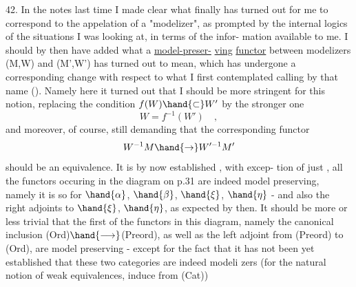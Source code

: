 42. In the notes last time I made clear what finally has turned out for
me to correspond to the appelation of a "modelizer", as prompted by the
internal logics of the situations I was looking at, in terms of the infor-%
mation available to me. I should by then have added what a \uline{model-preser-}%
\uline{ving}  \uline{functor} between modelizers (M,W) and (M',W') has turned out to mean,
which has undergone a corresponding change with respect  to what I first
contemplated calling by that name (). Namely here it turned out that
I should be more stringent for this notion, replacing the condition
$f(W) \hand{\subset} W'$ by the stronger one
\[ W = f^{-1}(W') \quad , \]
and moreover, of course, still demanding that the corresponding functor
\[ W^{-1}M \hand{\to} W'^{-1}M' \]
should be an equivalence. It is by now established , with   excep-%
tion of just  ,   all the functors occuring in the diagram on p.31 are
indeed model preserving, namely it is so for $\hand{\alpha}$, $\hand{\beta}$, $\hand{\xi}$, $\hand{\eta}$ - and also
the right adjoints to $\hand{\xi}$, $\hand{\eta}$, as expected by then. It should be more or 
less trivial that the first of the functors in this diagram, namely
the canonical inclusion (Ord)$\hand{\longrightarrow}$(Preord), as well as the left adjoint
from (Preord) to (Ord), are model preserving - except for the fact that it
has not been yet established that these two categories are indeed modeli
zers (for the natural notion of weak equivalences, induce from (Cat))\hand{,}
